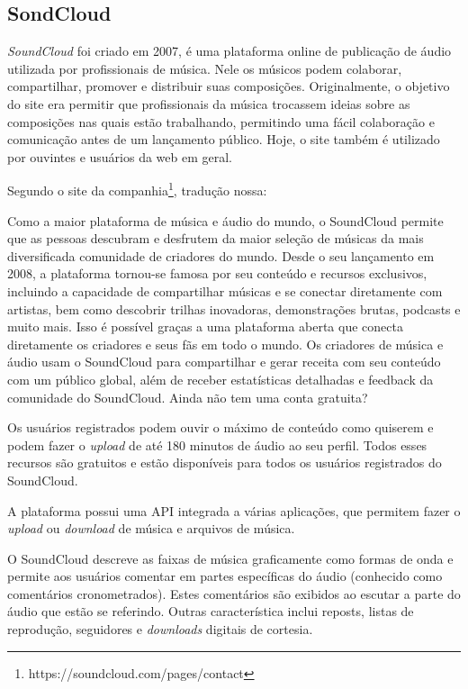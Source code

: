 \subsection{SondCloud}
\textit{SoundCloud} foi criado em 2007, é uma plataforma online de publicação de áudio utilizada por profissionais de música. Nele os músicos podem colaborar, compartilhar, promover e distribuir suas composições.
Originalmente, o objetivo do site era permitir que profissionais da música trocassem ideias sobre as composições nas quais estão trabalhando, permitindo uma fácil colaboração e comunicação antes de um lançamento público. Hoje, o site também é utilizado por ouvintes e usuários da web em geral.

Segundo o site da companhia\footnote{https://soundcloud.com/pages/contact}, tradução nossa:

\begin{citacao}
Como a maior plataforma de música e áudio do mundo, o SoundCloud permite que as pessoas descubram e desfrutem da maior seleção de músicas da mais diversificada comunidade de criadores do mundo. Desde o seu lançamento em 2008, a plataforma tornou-se famosa por seu conteúdo e recursos exclusivos, incluindo a capacidade de compartilhar músicas e se conectar diretamente com artistas, bem como descobrir trilhas inovadoras, demonstrações brutas, podcasts e muito mais. Isso é possível graças a uma plataforma aberta que conecta diretamente os criadores e seus fãs em todo o mundo. Os criadores de música e áudio usam o SoundCloud para compartilhar e gerar receita com seu conteúdo com um público global, além de receber estatísticas detalhadas e feedback da comunidade do SoundCloud. Ainda não tem uma conta gratuita? \cite{soundcloud2007}
\end{citacao}

Os usuários registrados podem ouvir o máximo de conteúdo como quiserem e podem fazer o \textit{upload} de até 180 minutos de áudio ao seu perfil. Todos esses recursos são gratuitos e estão disponíveis para todos os usuários registrados do SoundCloud.

A plataforma possui uma API integrada a várias aplicações, que permitem fazer o \textit{upload} ou \textit{download} de música e arquivos de música.

O SoundCloud descreve as faixas de música graficamente como formas de onda e permite aos usuários comentar em partes específicas do áudio (conhecido como comentários cronometrados). Estes comentários são exibidos ao escutar a parte do áudio que estão se referindo. Outras característica inclui reposts, listas de reprodução, seguidores e \textit{downloads} digitais de cortesia.


